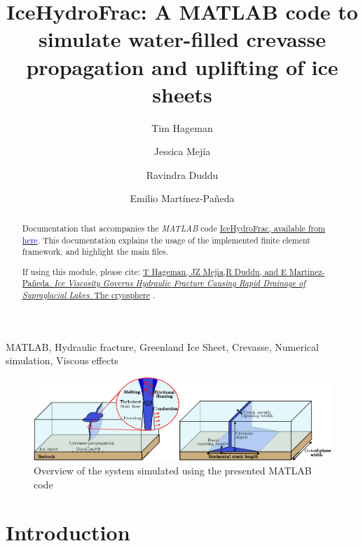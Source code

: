 \documentclass[3p]{elsarticle} %
\let\oldtodo\todo
\renewcommand{\todo}[1]{\oldtodo[inline]{#1}}
\newcommand{\citeMe}{\href{https://doi.org/10.1016/j.cma.2023.116235}{T Hageman, JZ Mejia,R Duddu, and E {Martinez-Pa{\~n}eda}. \textit{Ice Viscosity Governs Hydraulic Fracture Causing Rapid Drainage of Supraglacial Lakes}. The cryosphere} \citep{Hageman}}
\begin{document}
\begin{frontmatter}
\title{IceHydroFrac: A MATLAB code to simulate water-filled crevasse propagation and uplifting of ice sheets }

\author[1]{Tim Hageman }
\author[2]{Jessica Mejía}
\author[3]{Ravindra Duddu} 
\author[1]{Emilio Martínez-Pañeda}

\address[1]{Department of Engineering Science, University of Oxford, Oxford OX1 3PJ, UK}
\address[2]{Department of Geology, University at Buffalo, Buffalo, NY 14260, USA}
\address[3]{Department of Civil and Environmental Engineering, Department of Earth and Environmental Sciences, Vanderbilt University, Nashville, TN 37235, USA}

\begin{abstract}
Documentation that accompanies the \textit{MATLAB} code \href{https://github.com/T-Hageman/MATLAB_IceHydroFrac}{IceHydroFrac, available from \textcolor{blue}{here}}. This documentation explains the usage of the implemented finite element framework, and highlight the main files.  

If using this module, please cite: \citeMe{}.
\end{abstract}

\begin{keyword}
MATLAB, Hydraulic fracture, Greenland Ice Sheet, Crevasse, Numerical simulation, Viscous effects
\end{keyword}

\end{frontmatter}

\begin{figure}
	\centering
	\includegraphics[width=16cm]{Figures/CaseOverview.eps}
	\caption{Overview of the system simulated using the presented MATLAB code}
\end{figure}

\newpage
\tableofcontents

\newpage
\section{Introduction}
\todo{Intro sentences}
\end{document}
